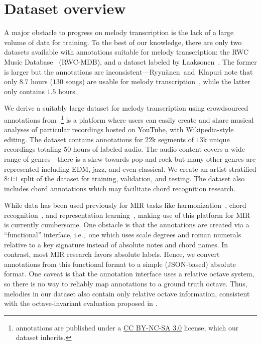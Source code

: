 \vspace{-2mm}
\section{Dataset overview}
\label{sec:dataset}

A major obstacle to progress on melody transcription is the lack of a large volume of data for training. 
To the best of our knowledge, 
there are only two datasets available with annotations suitable for melody transcription: the RWC Music Database~\cite{goto2002rwc,goto2003rwc,goto2004development} (RWC-MDB), 
and a dataset labeled by Laaksonen~\cite{laaksonen2014automatic}. 
The former is larger but the annotations are inconsistent---Ryyn{\"a}nen~and~Klapuri note that only $8.7$ hours ($130$ songs) are usable for melody transcription~\cite{ryynanen2008automatic}, while the latter only contains $1.5$ hours. 

We derive a suitably large dataset for melody transcription using crowdsourced annotations from \hooktheory{}.\footnote{\hooktheory{} annotations are published under a \href{https://creativecommons.org/licenses/by-nc-sa/3.0/}{CC BY-NC-SA 3.0} license, which our dataset inherits.}
\hooktheory{} is a platform where users can easily create and share musical analyses of particular recordings hosted on YouTube, with Wikipedia-style editing. 
The dataset contains annotations for $22$k segments of $13$k unique recordings totaling $50$ hours of labeled audio. 
The audio content covers a wide range of genres---there is a skew towards pop and rock but many other genres are represented including EDM, jazz, and even classical. 
We create an artist-stratified $8$:$1$:$1$ split of the dataset for training, validation, and testing. 
The dataset also includes chord annotations which may facilitate chord recognition research.

While \hooktheory{} data has been used previously for MIR tasks like 
harmonization~\cite{chen2021surprisenet,yeh2021automatic}, 
chord recognition~\cite{jiang2019mirex}, and 
representation learning~\cite{jiang2020transformer}, 
making use of this platform for MIR is currently cumbersome. 
One obstacle is that the annotations are created via a ``functional'' interface, i.e.,~one which uses scale degrees and roman numerals relative to a key signature instead of absolute notes and chord names. 
In contrast, most MIR research favors absolute labels.
Hence, we convert annotations from this functional format to a simple (JSON-based) absolute format. 
One caveat is that the \hooktheory{} annotation interface uses a relative octave system, 
so there is no way to reliably map annotations to a ground truth octave.
Thus, melodies in our dataset also contain only relative octave information, consistent with the octave-invariant evaluation proposed in .